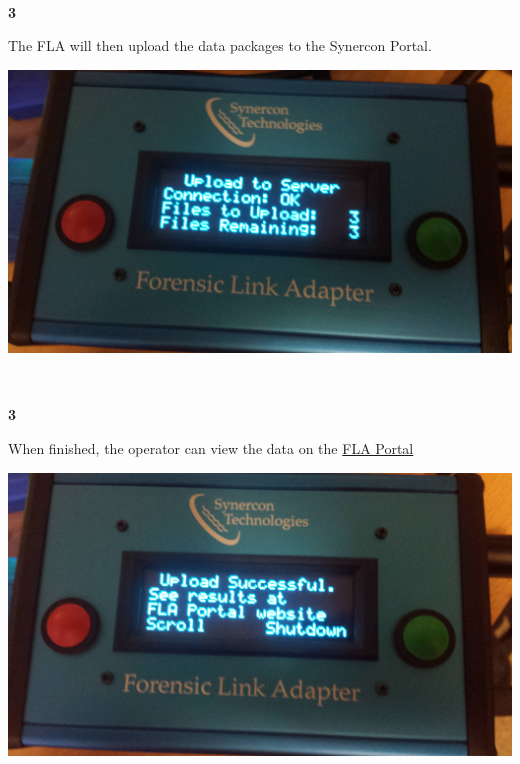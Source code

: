 \documentclass[11pt]{article}
\begin{document}
\\[\baselineskip]
\noindent\begin{minipage}{0.3\textwidth}%
\begin{center}
\textbf{3}\\[\baselineskip]
\end{center}
The FLA will then upload the data packages to the Synercon Portal.
\end{minipage}%
\hfill%
\begin{minipage}{0.6\textwidth}
\includegraphics[width=\linewidth]{./fla_screens/upload_uploading}
\end{minipage}
\\[\baselineskip]
\noindent\begin{minipage}{0.3\textwidth}%
\begin{center}
\textbf{3}\\[\baselineskip]
\end{center}
When finished, the operator can view the data on the \href{https://fla.synercontechnologies.com}{FLA Portal}
\end{minipage}%
\hfill%
\begin{minipage}{0.6\textwidth}
\includegraphics[width=\linewidth]{./fla_screens/upload_finished}
\end{minipage}
\end{document}
